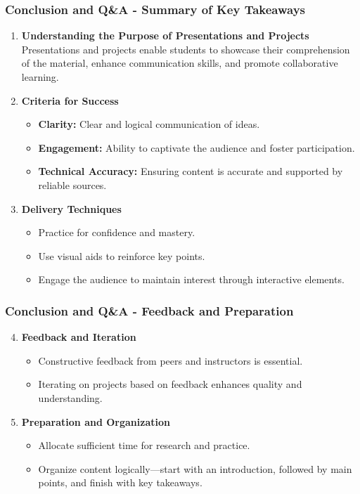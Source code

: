 \documentclass{beamer}
\begin{document}
\begin{frame}[fragile]
    \frametitle{Conclusion and Q\&A - Summary of Key Takeaways}
    \begin{enumerate}
        \item \textbf{Understanding the Purpose of Presentations and Projects}  
            Presentations and projects enable students to showcase their comprehension of the material, enhance communication skills, and promote collaborative learning.
        
        \item \textbf{Criteria for Success}
            \begin{itemize}
                \item \textbf{Clarity:} Clear and logical communication of ideas.
                \item \textbf{Engagement:} Ability to captivate the audience and foster participation.
                \item \textbf{Technical Accuracy:} Ensuring content is accurate and supported by reliable sources.
            \end{itemize}

        \item \textbf{Delivery Techniques}
            \begin{itemize}
                \item Practice for confidence and mastery.
                \item Use visual aids to reinforce key points.
                \item Engage the audience to maintain interest through interactive elements.
            \end{itemize}
    \end{enumerate}
\end{frame}

\begin{frame}[fragile]
    \frametitle{Conclusion and Q\&A - Feedback and Preparation}
    \begin{enumerate}
        \setcounter{enumi}{3}
        \item \textbf{Feedback and Iteration}
            \begin{itemize}
                \item Constructive feedback from peers and instructors is essential.
                \item Iterating on projects based on feedback enhances quality and understanding.
            \end{itemize}

        \item \textbf{Preparation and Organization}
            \begin{itemize}
                \item Allocate sufficient time for research and practice.
                \item Organize content logically—start with an introduction, followed by main points, and finish with key takeaways.
            \end{itemize}
    \end{enumerate}
\end{frame}
\end{document}
